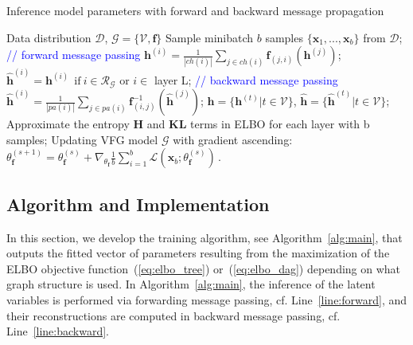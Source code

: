 \documentclass[twoside]{article}
\begin{document}
\begin{algorithm}[t]
   \caption{Inference model parameters with  forward and backward message propagation}
   \label{alg:main}
\begin{algorithmic}[1]
    Data distribution $\mathcal{D}$,  $\mathcal{G} = \{\mathcal{V}, \mathbf{f}\}$
   \STATE  Sample minibatch $b$ samples $\{\mathbf{x}_1, ..., \mathbf{x}_b \}$ from $\mathcal{D}$;
   \label{line:for2} 
    \STATE  \textcolor{blue}{// forward message passing}
   \STATE $\mathbf{h}^{(i)} = \frac{1}{|ch(i)|} \sum_{j \in ch(i) } \mathbf{f}_{(j,i)}(\mathbf{h}^{(j)})$; \label{line:forward} 
    \ENDFOR
    \STATE $\widehat{\mathbf{h}}^{(i)} = \mathbf{h}^{(i)} \ \  \text{if} \ i \in \mathcal{R}_{\mathcal{G}} $ or $i \in$ layer L;
   \STATE \textcolor{blue}{// backward message passing}
   \STATE $\widehat{\mathbf{h}}^{(i)} = \frac{1}{|pa(i)|} \sum_{j \in pa(i) } \mathbf{f}^{-1}_{ (i,j)}(\widehat{\mathbf{h}}^{(j)}) $;\label{line:backward}  
   \ENDFOR
    \STATE  $\mathbf{h} =  \{\mathbf{h}^{(t)} \big |  t \in \mathcal{V} \}$, $\widehat{\mathbf{h}} =  \{\widehat{\mathbf{h}}^{(t)} \big | t \in \mathcal{V} \}$;
    \STATE Approximate the entropy $\mathbf{H}$ and $\mathbf{KL}$ terms in ELBO for each layer with b samples;
    \STATE Updating VFG model $\mathcal{G}$ with gradient ascending: $\theta^{(s+1)}_{\mathbf{f}} = \theta^{(s)}_{\mathbf{f}} + \nabla_{\theta_{\mathbf{f}}}\frac{1}{b} \sum_{i=1}^b  \mathcal{L}(\mathbf{x}_b; \theta^{(s)}_{\mathbf{f}})   \, .$\label{line:update} 
   \ENDFOR
\end{algorithmic}
\end{algorithm}

\subsection{Algorithm and Implementation}
In this section, we develop the training algorithm, see Algorithm~\ref{alg:main}, that outputs the fitted vector of parameters resulting from the maximization of the ELBO objective function~(\ref{eq:elbo_tree}) or~(\ref{eq:elbo_dag}) depending on what graph structure is used.
In Algorithm~\ref{alg:main}, the inference of the latent variables is performed via forwarding message passing, cf. Line~\ref{line:forward}, and their reconstructions are computed in backward message passing, cf. Line~\ref{line:backward}.
\end{document}
